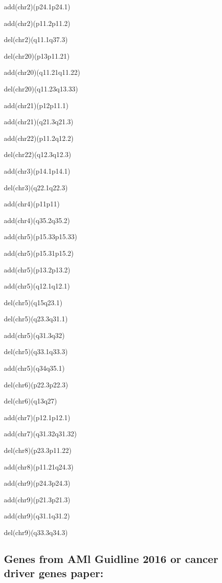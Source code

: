 \documentclass[]{article}
\begin{document}
add(chr2)(p24.1p24.1)

add(chr2)(p11.2p11.2)

del(chr2)(q11.1q37.3)

del(chr20)(p13p11.21)

add(chr20)(q11.21q11.22)

del(chr20)(q11.23q13.33)

add(chr21)(p12p11.1)

add(chr21)(q21.3q21.3)

add(chr22)(p11.2q12.2)

del(chr22)(q12.3q12.3)

add(chr3)(p14.1p14.1)

del(chr3)(q22.1q22.3)

add(chr4)(p11p11)

add(chr4)(q35.2q35.2)

add(chr5)(p15.33p15.33)

add(chr5)(p15.31p15.2)

add(chr5)(p13.2p13.2)

add(chr5)(q12.1q12.1)

del(chr5)(q15q23.1)

del(chr5)(q23.3q31.1)

add(chr5)(q31.3q32)

del(chr5)(q33.1q33.3)

add(chr5)(q34q35.1)

del(chr6)(p22.3p22.3)

del(chr6)(q13q27)

add(chr7)(p12.1p12.1)

add(chr7)(q31.32q31.32)

del(chr8)(p23.3p11.22)

add(chr8)(p11.21q24.3)

add(chr9)(p24.3p24.3)

add(chr9)(p21.3p21.3)

add(chr9)(q31.1q31.2)

del(chr9)(q33.3q34.3)

\hypertarget{genes-from-aml-guidline-2016-or-cancer-driver-genes-paper}{%
\subsection{Genes from AMl Guidline 2016 or cancer driver genes
paper:}\label{genes-from-aml-guidline-2016-or-cancer-driver-genes-paper}}
\end{document}
